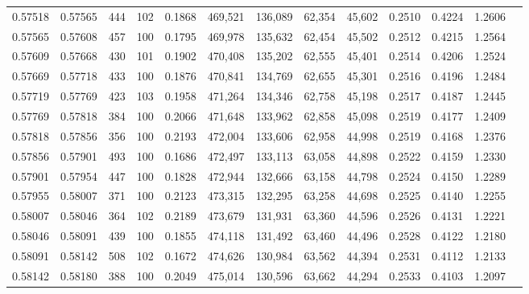 \begin{tabular}{rrrrrrrrrrrrr}
0.57518 & 0.57565 &   444 & 102 &                                     0.1868 & 469,521 & 136,089 &  62,354 &  45,602 & 0.2510 & 0.4224 & 1.2606 \\
0.57565 & 0.57608 &   457 & 100 &                                     0.1795 & 469,978 & 135,632 &  62,454 &  45,502 & 0.2512 & 0.4215 & 1.2564 \\
0.57609 & 0.57668 &   430 & 101 &                                     0.1902 & 470,408 & 135,202 &  62,555 &  45,401 & 0.2514 & 0.4206 & 1.2524 \\
0.57669 & 0.57718 &   433 & 100 &                                     0.1876 & 470,841 & 134,769 &  62,655 &  45,301 & 0.2516 & 0.4196 & 1.2484 \\
0.57719 & 0.57769 &   423 & 103 &                                     0.1958 & 471,264 & 134,346 &  62,758 &  45,198 & 0.2517 & 0.4187 & 1.2445 \\
0.57769 & 0.57818 &   384 & 100 &                                     0.2066 & 471,648 & 133,962 &  62,858 &  45,098 & 0.2519 & 0.4177 & 1.2409 \\
0.57818 & 0.57856 &   356 & 100 &                                     0.2193 & 472,004 & 133,606 &  62,958 &  44,998 & 0.2519 & 0.4168 & 1.2376 \\
0.57856 & 0.57901 &   493 & 100 &                                     0.1686 & 472,497 & 133,113 &  63,058 &  44,898 & 0.2522 & 0.4159 & 1.2330 \\
0.57901 & 0.57954 &   447 & 100 &                                     0.1828 & 472,944 & 132,666 &  63,158 &  44,798 & 0.2524 & 0.4150 & 1.2289 \\
0.57955 & 0.58007 &   371 & 100 &                                     0.2123 & 473,315 & 132,295 &  63,258 &  44,698 & 0.2525 & 0.4140 & 1.2255 \\
0.58007 & 0.58046 &   364 & 102 &                                     0.2189 & 473,679 & 131,931 &  63,360 &  44,596 & 0.2526 & 0.4131 & 1.2221 \\
0.58046 & 0.58091 &   439 & 100 &                                     0.1855 & 474,118 & 131,492 &  63,460 &  44,496 & 0.2528 & 0.4122 & 1.2180 \\
0.58091 & 0.58142 &   508 & 102 &                                     0.1672 & 474,626 & 130,984 &  63,562 &  44,394 & 0.2531 & 0.4112 & 1.2133 \\
0.58142 & 0.58180 &   388 & 100 &                                     0.2049 & 475,014 & 130,596 &  63,662 &  44,294 & 0.2533 & 0.4103 & 1.2097 \\

\end{tabular}
